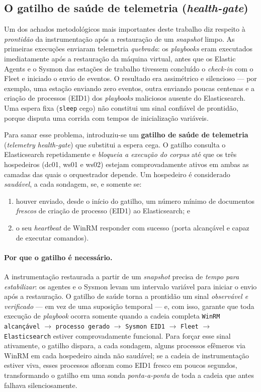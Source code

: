 \subsection{O gatilho de saúde de telemetria (\textit{health-gate})}
\label{subsec:health-gate}

Um dos achados metodológicos mais importantes deste trabalho diz respeito à
\emph{prontidão} da instrumentação após a restauração de um \textit{snapshot}
limpo. As primeiras execuções enviaram telemetria \emph{quebrada}: os
\textit{playbooks} eram executados imediatamente após a restauração da máquina
virtual, antes que os Elastic Agents e o Sysmon das estações de trabalho tivessem
concluído o \textit{check-in} com o Fleet e iniciado o envio de eventos.
O resultado era assimétrico e silencioso --- por exemplo, uma estação enviando
zero eventos, outra enviando poucas centenas e a criação de processos (EID1) dos
\textit{playbooks} maliciosos ausente do Elasticsearch. Uma espera fixa
(\texttt{sleep} cego) não constitui um sinal confiável de prontidão, porque
disputa uma corrida com tempos de inicialização variáveis.

Para sanar esse problema, introduziu-se um \textbf{gatilho de saúde de
telemetria} (\textit{telemetry health-gate}) que substitui a espera cega. O
gatilho consulta o Elasticsearch repetidamente e \emph{bloqueia a execução do
corpus} até que os três hospedeiros (dc01, ws01 e ws02) estejam comprovadamente
ativos em ambas as camadas das quais o orquestrador depende. Um hospedeiro é
considerado \emph{saudável}, a cada sondagem, se, e somente se:

\begin{enumerate}
    \item houver enviado, desde o início do gatilho, um número mínimo de
    documentos \emph{frescos} de criação de processo (EID1) ao Elasticsearch; e
    \item o seu \textit{heartbeat} de WinRM responder com sucesso (porta
    alcançável e capaz de executar comandos).
\end{enumerate}

\paragraph{Por que o gatilho é necessário.} A instrumentação restaurada a partir
de um \textit{snapshot} precisa de \emph{tempo para estabilizar}: os agentes e o
Sysmon levam um intervalo variável para iniciar o envio após a restauração. O
gatilho de saúde torna a prontidão um sinal \emph{observável e verificado} --- em
vez de uma suposição temporal --- e, com isso, garante que toda execução de
\textit{playbook} ocorra somente quando a cadeia completa
\texttt{WinRM alcançável} $\rightarrow$ \texttt{processo gerado} $\rightarrow$
\texttt{Sysmon EID1} $\rightarrow$ \texttt{Fleet} $\rightarrow$
\texttt{Elasticsearch} estiver comprovadamente funcional. Para forçar esse
sinal ativamente, o gatilho dispara, a cada sondagem, alguns processos
efêmeros via WinRM em cada hospedeiro ainda não saudável; se a cadeia de
instrumentação estiver viva, esses processos afloram como EID1 fresco em poucos
segundos, transformando o gatilho em uma sonda \textit{ponta-a-ponta} de toda a
cadeia que antes falhava silenciosamente.

